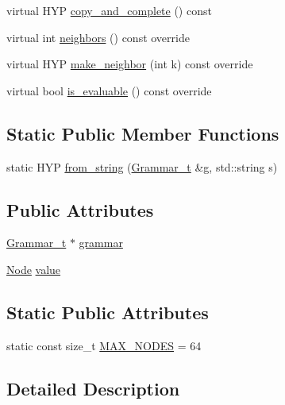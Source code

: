 \begin{DoxyCompactItemize}
\item 
virtual H\+YP \hyperlink{class_l_o_t_hypothesis_af643fa8b19e3bd0fa4682ab3566e29fc}{copy\+\_\+and\+\_\+complete} () const
\item 
virtual int \hyperlink{class_l_o_t_hypothesis_a097cde606ec3f277fdeb92145599027f}{neighbors} () const override
\item 
virtual H\+YP \hyperlink{class_l_o_t_hypothesis_a997c88cb84133efc599b9b14173aefe9}{make\+\_\+neighbor} (int k) const override
\item 
virtual bool \hyperlink{class_l_o_t_hypothesis_a9eeaaf321324d2418405f4d7252f6ca4}{is\+\_\+evaluable} () const override
\end{DoxyCompactItemize}
\subsection*{Static Public Member Functions}
\begin{DoxyCompactItemize}
\item 
static H\+YP \hyperlink{class_l_o_t_hypothesis_aa1e3f898618de841bfd8c9279a107211}{from\+\_\+string} (\hyperlink{class_l_o_t_hypothesis_a8006204013d471860e54c49d19edbace}{Grammar\+\_\+t} \&g, std\+::string s)
\end{DoxyCompactItemize}
\subsection*{Public Attributes}
\begin{DoxyCompactItemize}
\item 
\hyperlink{class_l_o_t_hypothesis_a8006204013d471860e54c49d19edbace}{Grammar\+\_\+t} $\ast$ \hyperlink{class_l_o_t_hypothesis_affae32db28c39df676809ae47e14e7cf}{grammar}
\item 
\hyperlink{class_node}{Node} \hyperlink{class_l_o_t_hypothesis_ac759b3eab77ead1749b905a3dde74961}{value}
\end{DoxyCompactItemize}
\subsection*{Static Public Attributes}
\begin{DoxyCompactItemize}
\item 
static const size\+\_\+t \hyperlink{class_l_o_t_hypothesis_a0231650d938c098118a4c4bdb201fc61}{M\+A\+X\+\_\+\+N\+O\+D\+ES} = 64
\end{DoxyCompactItemize}


\subsection{Detailed Description}
